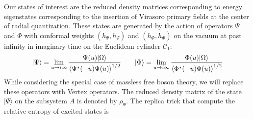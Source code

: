\documentclass[11pt]{article}
\newcommand{\p}{\partial}
\newcommand{\mO}{\mathcal{O}}
\newcommand{\nn}{\nonumber}
\newcommand{\lb}{\left(}
\newcommand{\rb}{\right)}
\newcommand{\JM}[1]{\textcolor{orange}{#1}}
\begin{document}
  Our states of interest are the reduced density matrices corresponding to
  energy eigenstates corresponding to the insertion of Virasoro primary fields at the center of radial quantization. These states are generated by the action of 
  operators $\Psi$ and $\Phi$ with conformal weights $(h_\Psi, \bar h_\Psi)$ and $(h_\Phi, \bar h_\Phi)$
  on the vacuum at past infinity in imaginary
  time on the Euclidean cylinder $\mathcal{C}_{1}$:
    \begin{equation}
    |\Psi\rangle = \lim_{u\to i\infty}\frac{\Psi(u)|\Omega\rangle}{\braket{\Psi^*(-u)\Psi(u)}^{1/2}} \qquad |\Phi\rangle = \lim_{u\to i\infty}\frac{\Phi(u)|\Omega\rangle}{\braket{\Phi^*(-u)\Phi(u)}^{1/2}}
  \end{equation}
  While considering the special case of massless free boson theory, we will replace these operators with Vertex operators.
  The reduced density matrix of the state   
  $|\Psi \rangle$
  on the subsystem $A$
  is denoted by 
  $\rho_\Psi$.
The replica trick that compute the relative entropy of excited states is
\end{document}
